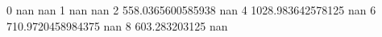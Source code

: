 0 nan nan
1 nan nan
2 558.0365600585938 nan
4 1028.983642578125 nan
6 710.9720458984375 nan
8 603.283203125 nan
